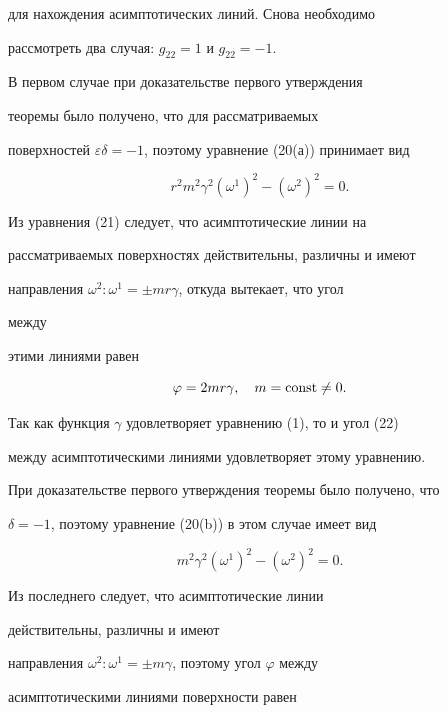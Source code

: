 для нахождения асимптотических линий. Снова необходимо


рассмотреть два случая: $g_{22}=1$ и $g_{22}=-1$.


В первом случае при доказательстве первого утверждения 


теоремы было получено, что для рассматриваемых


поверхностей $\varepsilon\delta=-1$, поэтому уравнение (20(а)) принимает вид


\begin{equation}


r^2m^2\gamma^2(\omega^1)^2-(\omega^2)^2=0.


\end{equation}


Из уравнения (21) следует, что асимптотические линии на


рассматриваемых поверхностях действительны, различны и имеют


направления $\omega^2:\omega^1=\pm m r \gamma$, откуда вытекает, что угол 


между


этими линиями равен


\begin{equation}


\varphi=2 m r \gamma,\quad m=\const\ne0.


\end{equation}


Так как функция $\gamma$ удовлетворяет уравнению (1), то и угол (22)


между асимптотическими линиями удовлетворяет этому уравнению.





При доказательстве первого утверждения теоремы было получено, что


$\delta=-1$, поэтому уравнение (20(b)) в этом случае имеет вид


\begin{equation}


m^2\gamma^2(\omega^1)^2-(\omega^2)^2=0.


\end{equation}


Из последнего следует, что асимптотические линии


действительны, различны и имеют


направления $\omega^2:\omega^1=\pm m\gamma$, поэтому угол $\varphi$ между


асимптотическими линиями поверхности равен


